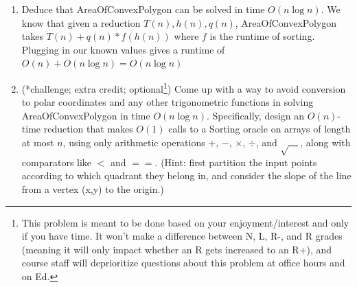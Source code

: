 \documentclass[11pt]{report}
\begin{document}
\begin{enumerate}
\begin{enumerate}
        Now we can make one call to the oracle that solves Sorting, sorting our resulting list of points by their angles.

        This gives us a list of adjacent points.
        Pairing up consecutive points along with the point $(1,1)$ partitions the polygon into triangles, whose areas when added up gives the area of the whole polygon.

        Specifically, $\forall i \in range(n),$ our side lengths are
        
        $a = r_i$

        $b=r_{i+1}$

        $c=\sqrt{r_i^2+r_{i+1}^2+2 r_i r_{i+1} \cos(\theta_{i+1} - \theta_{i})}$

        We can then plug in these side lengths to heron's formula to solve for the area of each triangle.

        Assuming these take O(1) time to compute, finding the area of all of these triangles takes O(n) time.

        Summing each of these also takes time O(n) for n triangles to sum.

        Thus in total, assuming that an oracle call to Solving takes O(1) time, T(n) for this reduction is O(n). We only make one call to sorting (q=1), and each call to sorting takes as an input an array of size n.

        These gives in reduction notation $O(n),n$


        
        \item Deduce that AreaOfConvexPolygon can be solved in time $O(n\log n)$.
        We know that given a reduction $T(n),h(n),q(n)$, AreaOfConvexPolygon takes
        $T(n) + q(n)*f(h(n))$ where $f$ is the runtime of sorting.
        Plugging in our known values gives a runtime of
        $O(n) + O(n\log{n}) = O(n\log{n})$
        
        \item (*challenge; extra credit; optional\footnote{This problem is meant to be done based on your enjoyment/interest and only if you have time. It won't make a difference between N, L, R-, and R grades (meaning it will only impact whether an R gets increased to an R+), and course staff will deprioritize questions about this problem at office hours and on Ed.})  Come up with a way to avoid conversion to polar coordinates and any other trigonometric functions in solving AreaOfConvexPolygon in time $O(n\log n)$.  Specifically, design an $O(n)$-time reduction that makes $O(1)$ calls to a Sorting oracle on arrays of length at most $n$, using only arithmetic operations $+$, $-$, $\times$, $\div$, and $\sqrt{\hspace{1em}}$, along with comparators like $<$ and $==$.  (Hint: first partition the input points according to which quadrant they belong in, and consider the slope of the line from a vertex (x,y) to the origin.) \label{part:nopolar}
        

\end{enumerate}
\end{enumerate}
\end{document}
